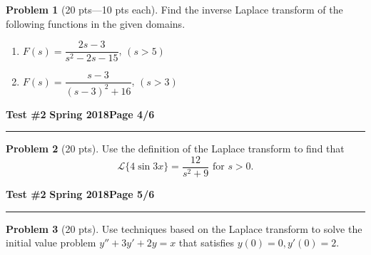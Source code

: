 \documentclass[12pt]{article}
\theoremstyle{definition}
\newtheorem{problem}{Problem}
\begin{document}
\bigskip
\begin{problem}[20 pts---10 pts each]
Find the inverse Laplace transform of the following functions in the given domains.
\begin{enumerate}
  \item $F(s) = \dfrac{2s-3}{s^2-2s-15}$, $(s>5)$
  \vspace{8cm}
  \begin{flushright}
  \end{flushright} 
  \item $F(s) =\dfrac{s-3}{(s-3)^2+16}$, $(s>3)$
  \vspace{8cm}
  \begin{flushright}
  \end{flushright} 
\end{enumerate}
\end{problem}
\newpage

\hfill{\large\bf Test \#2}\hfill{\large\bf
  Spring 2018}\hfill{\large\bf Page 4/6}\hrule

\bigskip
\begin{problem}[20 pts]
Use the definition of the Laplace transform to find that 
\begin{equation*}
\mathcal{L}\{ 4\sin 3x \} = \frac{12}{s^2 + 9}
 \text{ for }s>0.
\end{equation*}

\end{problem}
\newpage

\hfill{\large\bf Test \#2}\hfill{\large\bf
  Spring 2018}\hfill{\large\bf Page 5/6}\hrule

\bigskip
\begin{problem}[20 pts]
Use techniques based on the Laplace transform to solve the initial value problem $y''+3y'+2y=x$ that satisfies $y(0)=0, y'(0)=2$.
\vspace{20cm}
\begin{flushright}
\end{flushright}
\end{problem}
\newpage
\end{document}
